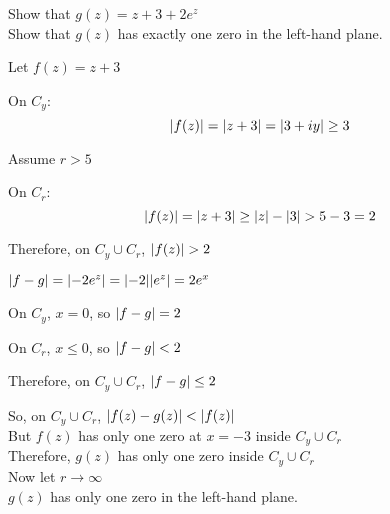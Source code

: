 \documentclass[letterpaper,12pt,fleqn]{article}
\begin{document}
\begin{example}
  Show that $g(z)=z+3+2e^z$ \\
  Show that $g(z)$ has exactly one zero in the left-hand plane.

  \begin{minipage}{3in}
  \end{minipage}
  \begin{minipage}{3in}
    Let $f(z)=z+3$
    
    \bigskip
    
    On $C_y$:
    \[\lvert f(z)\rvert=\lvert z+3\rvert=\lvert3+iy\rvert\ge3\]

    Assume $r>5$
    
    On $C_r$:
    \[\lvert f(z)\rvert=\lvert z+3\rvert\ge\lvert z\rvert-\lvert3\rvert>5-3=2\]

    Therefore, on $C_y\cup C_r$, $\lvert f(z)\rvert> 2$
  \end{minipage}

  $\lvert f-g\rvert=\lvert-2e^z\rvert=\lvert-2\rvert\lvert e^z\rvert=2e^x$

  On $C_y$, $x=0$, so $\lvert f-g\rvert=2$

  On $C_r$, $x\le0$, so $\lvert f-g\rvert<2$

  Therefore, on $C_y\cup C_r$, $\lvert f-g\rvert\le2$

  So, on $C_y\cup C_r$, $\lvert f(z)-g(z)\rvert<\lvert f(z)\rvert$ \\
  But $f(z)$ has only one zero at $x=-3$ inside $C_y\cup C_r$ \\
  Therefore, $g(z)$ has only one zero inside $C_y\cup C_r$ \\
  Now let $r\to\infty$ \\
  $g(z)$ has only one zero in the left-hand plane.
\end{example}
\end{document}
